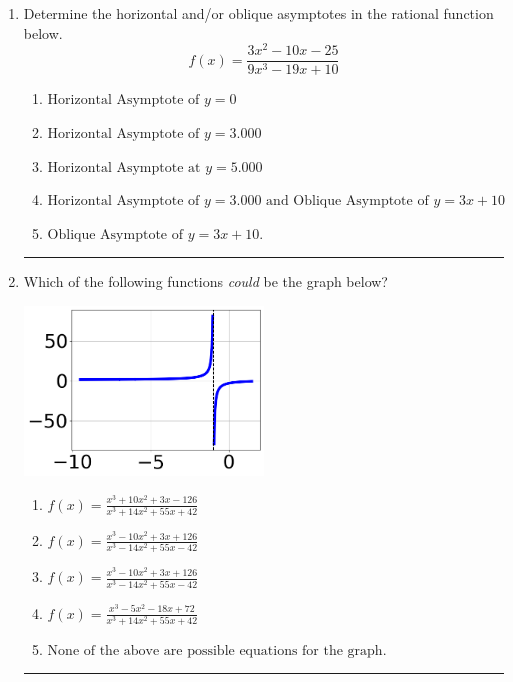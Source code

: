 \documentclass[14pt]{extbook}
\newcommand{\litem}[1]{\item#1\hspace*{-1cm}\rule{\textwidth}{0.4pt}}
\begin{document}
\begin{enumerate}
{\begin{enumerate}[label=\Alph*.]
\end{enumerate} }
\litem{
Determine the horizontal and/or oblique asymptotes in the rational function below.\[ f(x) = \frac{3x^{2} -10 x -25}{9x^{3} -19 x + 10} \]\begin{enumerate}[label=\Alph*.]
\item \( \text{Horizontal Asymptote of } y = 0 \)
\item \( \text{Horizontal Asymptote of } y = 3.000  \)
\item \( \text{Horizontal Asymptote at } y = 5.000 \)
\item \( \text{Horizontal Asymptote of } y = 3.000 \text{ and Oblique Asymptote of } y = 3x + 10 \)
\item \( \text{Oblique Asymptote of } y = 3x + 10. \)

\end{enumerate} }
\litem{
Which of the following functions \textit{could} be the graph below?
\begin{center}
    \includegraphics[width=0.5\textwidth]{../Figures/identifyGraphOfRationalFunctionCopyA.png}
\end{center}
\begin{enumerate}[label=\Alph*.]
\item \( f(x)=\frac{x^{3} +10 x^{2} +3 x -126}{x^{3} +14 x^{2} +55 x + 42} \)
\item \( f(x)=\frac{x^{3} -10 x^{2} +3 x + 126}{x^{3} -14 x^{2} +55 x -42} \)
\item \( f(x)=\frac{x^{3} -10 x^{2} +3 x + 126}{x^{3} -14 x^{2} +55 x -42} \)
\item \( f(x)=\frac{x^{3} -5 x^{2} -18 x + 72}{x^{3} +14 x^{2} +55 x + 42} \)
\item \( \text{None of the above are possible equations for the graph.} \)


\end{enumerate}}
\end{enumerate}
\end{document}
